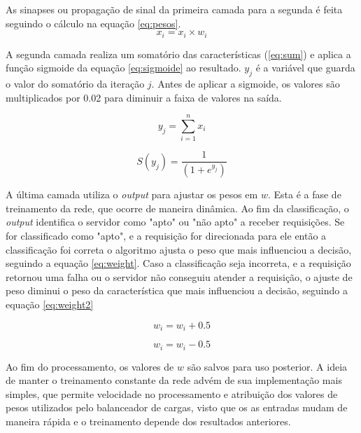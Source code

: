 As sinapses ou propagação de sinal da primeira camada para a segunda é feita seguindo o cálculo na equação \ref{eq:pesos}. 
\begin{equation}
x_i = x_i \times w_i
\label{eq:pesos}
\end{equation}

A segunda camada realiza um somatório das características (\ref{eq:sum}) e aplica a função sigmoide da equação \ref{eq:sigmoide} ao resultado. $y_j$ é a variável que guarda o valor do somatório da iteração $j$. Antes de aplicar a sigmoide, os valores são multiplicados por 0.02 para diminuir a faixa de valores na saída. 

\begin{equation}
y_j = \sum_{i=1}^{n} {x_i}
\label{eq:sum}
\end{equation}


\begin{equation}
S(y_j) =  \frac{1}{(1 + e ^ {y_j} )} 
\label{eq:sigmoide}
\end{equation}

A última camada utiliza o \textit{output} para ajustar os pesos em $w$. Esta é a fase de treinamento da rede, que ocorre de maneira dinâmica. Ao fim da classificação, o \textit{output} identifica o servidor como "apto" ou "não apto" a receber requisições. Se for classificado como "apto", e a requisição for direcionada para ele então a classificação foi correta o algoritmo ajusta o peso que mais influenciou a decisão, seguindo a equação \ref{eq:weight}. Caso a classificação seja incorreta, e a requisição retornou uma falha ou o servidor não conseguiu atender a requisição, o ajuste de peso diminui o peso da característica que mais influenciou a decisão, seguindo a equação \ref{eq:weight2}

\begin{equation}
w_i = w_i + 0.5
\label{eq:weight}
\end{equation}

\begin{equation}
w_i = w_i - 0.5
\label{eq:weight2}
\end{equation}

Ao fim do processamento, os valores de $w$ são salvos para uso posterior. A ideia de manter o treinamento constante da rede advém de sua implementação mais simples, que permite velocidade no processamento e atribuição dos valores de pesos utilizados pelo balanceador de cargas, visto que os as entradas mudam de maneira rápida e o treinamento depende dos resultados anteriores. 

